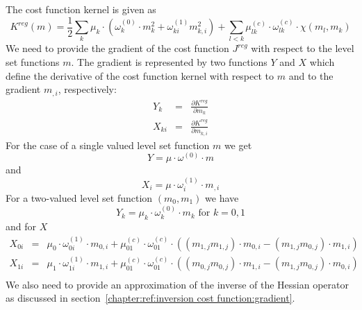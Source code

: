 The cost function kernel is given as
\begin{equation}\label{ref:EQU:REG:100}
K^{reg}(m) = \frac{1}{2}
\sum_{k} \mu_k \cdot ( \omega^{(0)}_k \cdot m_k^2 + \omega^{(1)}_{ki}m_{k,i}^2 ) 
+  \sum_{l<k} \mu^{(c)}_{lk} \cdot \omega^{(c)}_{lk}  \cdot  \chi(m_l,m_k)
\end{equation} 
We need to provide the gradient of the cost function $J^{reg}$  with respect to the level set functions $m$.
The gradient is represented by two functions $Y$ and $X$ which define the 
derivative of the cost function kernel with respect to $m$ and to the gradient $m_{,i}$, respectively:
\begin{equation}\label{ref:EQU:REG:101}
\begin{array}{rcl}
  Y_k & = & \displaystyle{\frac{\partial K^{reg}}{\partial m_k}} \\
   X_{ki} & = & \displaystyle{\frac{\partial K^{reg}}{\partial m_{k,i}}} 
\end{array}
\end{equation} 
For the case of a single valued level set function $m$ we get 
\begin{equation}\label{ref:EQU:REG:202}
Y = \mu \cdot \omega^{(0)} \cdot m
\end{equation} 
and 
\begin{equation}\label{ref:EQU:REG:203}
 X_{i} = \mu \cdot \omega^{(1)}_{i} \cdot m_{,i}
\end{equation}
For a two-valued level set function $(m_0,m_1)$ we have
\begin{equation}\label{ref:EQU:REG:302}
Y_k = \mu_k \cdot \omega^{(0)}_k \cdot m_k \mbox{ for } k=0,1
\end{equation} 
and for $X$ 
\begin{equation}\label{ref:EQU:REG:303}
\begin{array}{rcl}
 X_{0i} &  = & \mu_0 \cdot \omega^{(1)}_{0i} \cdot m_{0,i} + \mu^{(c)}_{01} \cdot \omega^{(c)}_{01} \cdot
\left( (m_{1,j}m_{1,j} ) \cdot m_{0,i} - (m_{1,j}m_{0,j} ) \cdot m_{1,i} \right) \\
 X_{1i} &  = & \mu_1 \cdot \omega^{(1)}_{1i} \cdot m_{1,i} + \mu^{(c)}_{01} \cdot \omega^{(c)}_{01} \cdot
\left( (m_{0,j}m_{0,j} ) \cdot m_{1,i} - (m_{1,j}m_{0,j} ) \cdot m_{0,i} \right)
\\
\end{array}
\end{equation}  
We also need to provide an approximation of the inverse of the Hessian operator as discussed in section~\ref{chapter:ref:inversion cost function:gradient}.

